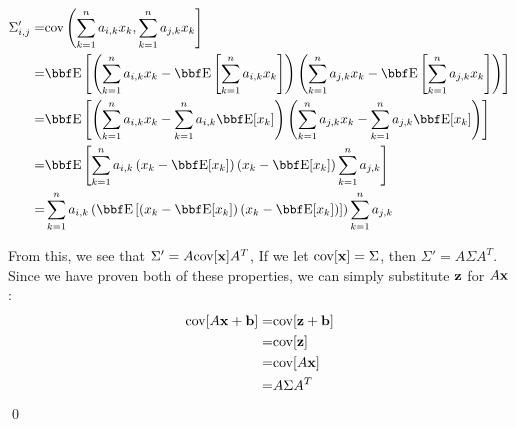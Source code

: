 \documentclass[12pt,letterpaper]{hmcpset}
\begin{document}
\begin{solution}
\begin{align*}
\Sigma'_{i, j} =& \cov\left( \sum_{k=1}^n a_{i, k}x_k, \sum_{k=1}^n a_{j, k}x_k\right]\\
=& \EE\left[ \left(\sum_{k=1}^n a_{i, k}x_k - \EE\left[\sum_{k=1}^n a_{i, k}x_k\right]\right) \left(\sum_{k=1}^n a_{j, k}x_k - \EE\left[\sum_{k=1}^n a_{j, k}x_k\right]\right)  \right]\\
=& \EE\left[ \left(\sum_{k=1}^n a_{i, k}x_k - \sum_{k=1}^n a_{i, k} \EE[x_k]\right) \left(\sum_{k=1}^n a_{j, k}x_k - \sum_{k=1}^n a_{j, k}\EE [x_k]\right)  \right]\\
=& \EE\left[ \sum_{k=1}^n a_{i, k} \left(x_k - \EE[x_k]\right) \left(x_k - \EE [x_k]\right)\sum_{k=1}^n a_{j, k}  \right]\\
=&  \sum_{k=1}^n a_{i, k} \left( \EE\left[\left(x_k - \EE[x_k]\right) \left(x_k - \EE [x_k]\right) \right]\right) \sum_{k=1}^n a_{j, k}  \\
\end{align*}

From this, we see that $\Sigma' = A{\hbox{cov}}[{\bf x}] A^T$,
If we let ${\hbox{cov}}[{\bf x}] = \Sigma$, then
 $\Sigma' = A\Sigma A^T$. \\

Since we have proven both of these properties,
we can simply substitute ${\bf z}$ for $A{\bf x}$:
\begin{align*}
  {\hbox{cov}}[A{\bf x} + {\bf b}] =&{\hbox{cov}}[{\bf z} + {\bf b}] \\
  =&{\hbox{cov}}[{\bf z} ] \\
  =& {\hbox{cov}}[A{\bf x}] \\
  =& A\Sigma A^T
\end{align*}
\qed

\end{solution}


\newpage
\end{document}
